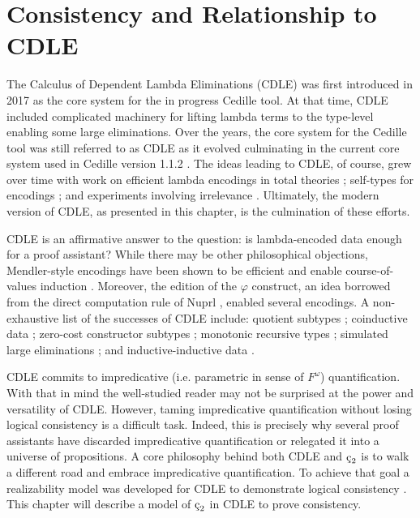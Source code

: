 \chapter{Consistency and Relationship to CDLE}




\newcommand{\cBool}{\textnormal{Bool}}
\newcommand{\ctt}{\textnormal{tt}}
\newcommand{\cff}{\textnormal{ff}}

\newcommand{\cId}{\textnormal{Id}}
\newcommand{\crefl}{\textnormal{refl}}
\newcommand{\ctheta}{\textnormal{theta}}
\newcommand{\csubst}{\textnormal{subst}}
\newcommand{\cdelta}{\textnormal{delta}}
\newcommand{\cirrel}{\textnormal{irrel}}

The Calculus of Dependent Lambda Eliminations (CDLE) was first introduced in 2017 \cite{stump2017_cdle} as the core system for the in progress Cedille tool.
At that time, CDLE included complicated machinery for lifting lambda terms to the type-level enabling some large eliminations.
Over the years, the core system for the Cedille tool was still referred to as CDLE as it evolved culminating in the current core system used in Cedille version 1.1.2 \cite{stump2021_cedillecore}.
The ideas leading to CDLE, of course, grew over time with work on efficient lambda encodings in total theories \cite{stump2016_encodings}; self-types for encodings \cite{fu2014self}; and experiments involving irrelevance \cite{sjoberg2012irrelevance,sjoberg2011equality}.
Ultimately, the modern version of CDLE, as presented in this chapter, is the culmination of these efforts.

CDLE is an affirmative answer to the question: is lambda-encoded data enough for a proof assistant?
While there may be other philosophical objections, Mendler-style encodings have been shown to be efficient and enable course-of-values induction \cite{firsov2018_mendler,firsov2018course}.
Moreover, the edition of the $\varphi$ construct, an idea borrowed from the direct computation rule of Nuprl \cite{allen2000}, enabled several encodings.
A non-exhaustive list of the successes of CDLE include: quotient subtypes \cite{marmaduke2020quotients}; coinductive data \cite{jenkins2020efficient}; zero-cost constructor subtypes \cite{marmaduke2020_constructor_subtyping}; monotonic recursive types \cite{jenkins2021monotone_recursive_types}; simulated large eliminations \cite{jenkins2021_large_elim}; and inductive-inductive data \cite{marmaduke2023_indind}.

CDLE commits to impredicative (i.e. parametric in sense of $F^\omega$) quantification.
With that in mind the well-studied reader may not be surprised at the power and versatility of CDLE.
However, taming impredicative quantification without losing logical consistency is a difficult task.
Indeed, this is precisely why several proof assistants have discarded impredicative quantification or relegated it into a universe of propositions.
A core philosophy behind both CDLE and $\ced$ is to walk a different road and embrace impredicative quantification.
To achieve that goal a realizability model was developed for CDLE to demonstrate logical consistency \cite{stump2021_cedillecore}.
This chapter will describe a model of $\ced$ in CDLE to prove consistency.

